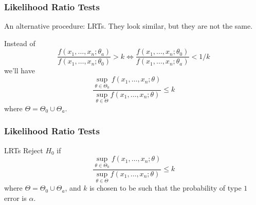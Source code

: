 \documentclass{beamer}
\begin{document}
\begin{frame}
\frametitle{Likelihood Ratio Tests}

An alternative procedure: LRTs. They look similar, but they are not the same. 
\newline


Instead of 
\[
\frac{f(x_1, \ldots, x_n ; \theta_{a})}{f(x_1, \ldots, x_n ; \theta_{0})} > k \iff \frac{f(x_1, \ldots, x_n ; \theta_{0})}{f(x_1, \ldots, x_n ; \theta_{a})} < 1/k
\]
we'll have
\[
\frac{ \sup_{\theta \in \Theta_0} f(x_1, \ldots, x_n ; \theta)}{ \sup_{\theta \in \Theta} f(x_1, \ldots, x_n ; \theta)} \le k
\]
where $\Theta = \Theta_0 \cup \Theta_a$.
\end{frame}


\begin{frame}
\frametitle{Likelihood Ratio Tests}

\begin{block}{LRTs}
Reject $H_0$ if 
\[
\frac{ \sup_{\theta \in \Theta_0} f(x_1, \ldots, x_n ; \theta)}{ \sup_{\theta \in \Theta} f(x_1, \ldots, x_n ; \theta)} \le k
\]
where $\Theta = \Theta_0 \cup \Theta_a$, and $k$ is chosen to be such that the probability of type $1$ error is $\alpha$.
\end{block}

\end{frame}
\end{document}
